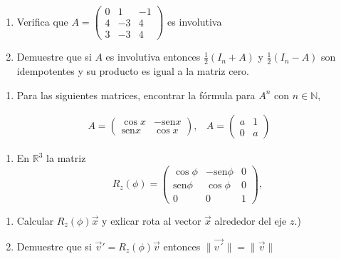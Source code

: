 \documentclass[
]{article}
\providecommand{\tightlist}{%
  \setlength{\itemsep}{0pt}\setlength{\parskip}{0pt}}
\begin{document}
\begin{enumerate}
\def\labelenumi{\alph{enumi})}
\item
  Verifica que
  \(A=\begin{pmatrix} 0 & 1 & -1 \\ 4 & -3 & 4 \\ 3 & -3 & 4 \end{pmatrix}\)
  es involutiva
\item
  Demuestre que si \(A\) es involutiva entonces \(\frac{1}{2}(I_n+A)\) y
  \(\frac{1}{2}(I_n-A)\) son idempotentes y su producto es igual a la
  matriz cero.
\end{enumerate}

\begin{enumerate}
\def\labelenumi{\arabic{enumi}.}
\setcounter{enumi}{2}
\tightlist
\item
  Para las siguientes matrices, encontrar la fórmula para \(A^{n}\) con
  \(n\in\mathbb{N}\),
\end{enumerate}

\[
\begin{array}{cr}
 A= \begin{pmatrix}
    \cos x       & -\mbox{sen} x \\
    \mbox{sen} x & \cos x
    \end{pmatrix}, &
A= \begin{pmatrix}
    a       & 1 \\
    0       & a
    \end{pmatrix} 
\end{array}
\]

\begin{enumerate}
\def\labelenumi{\arabic{enumi}.}
\setcounter{enumi}{3}
\tightlist
\item
  En \(\mathbb{R}^3\) la matriz \[
   R_z(\phi)= \begin{pmatrix}
           \cos \phi       & -\mbox{sen} \phi & 0 \\
           \mbox{sen}\phi  & \cos \phi        & 0 \\
           0               &      0           & 1
   \end{pmatrix},
  \]
\end{enumerate}

\begin{enumerate}
\def\labelenumi{\alph{enumi})}
\item
  Calcular \(R_z(\phi)\vec{x}\) y exlicar rota al vector \(\vec{x}\)
  alrededor del eje \(z\).)
\item
  Demuestre que si \(\vec{v}' = R_z(\phi)\vec{v}\) entonces
  \(\|\vec{v´}\|=\|\vec{v}\|\)
\end{enumerate}
\end{document}
